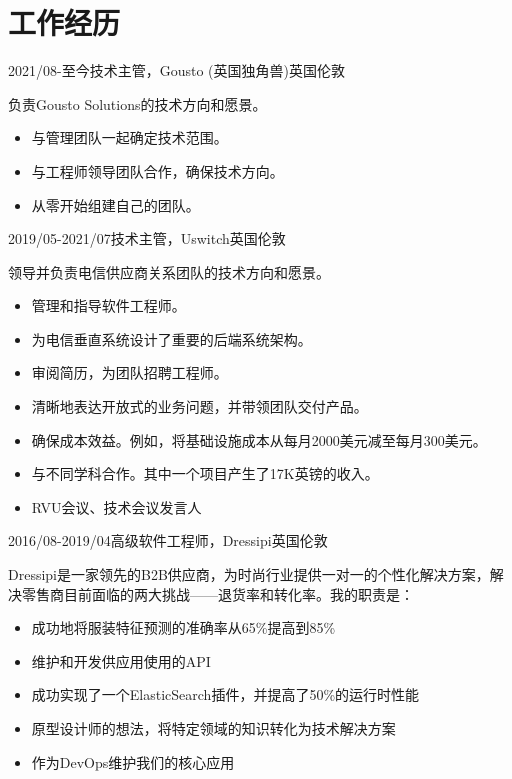 \documentclass[a4paper]{twentysecondcv-cn} %
\begin{document}
\section{工作经历}

\begin{twenty} %
	\twentyitem
	    {2021/08-至今}{技术主管，Gousto (英国独角兽)}{英国伦敦}
    	{负责Gousto Solutions的技术方向和愿景。
        	\begin{itemize}
              \item 与管理团队一起确定技术范围。
              \item 与工程师领导团队合作，确保技术方向。
              \item 从零开始组建自己的团队。
            \end{itemize}}
	\twentyitem
	    {2019/05-2021/07}{技术主管，Uswitch}{英国伦敦}
    	{领导并负责电信供应商关系团队的技术方向和愿景。
        	\begin{itemize}
              \item 管理和指导软件工程师。
              \item 为电信垂直系统设计了重要的后端系统架构。
              \item 审阅简历，为团队招聘工程师。
              \item 清晰地表达开放式的业务问题，并带领团队交付产品。
              \item 确保成本效益。例如，将基础设施成本从每月2000美元减至每月300美元。
              \item 与不同学科合作。其中一个项目产生了17K英镑的收入。
              \item RVU会议、技术会议发言人
            \end{itemize}}
	\twentyitem
	    {2016/08-2019/04}{高级软件工程师，Dressipi}{英国伦敦}
    	{Dressipi是一家领先的B2B供应商，为时尚行业提供一对一的个性化解决方案，解决零售商目前面临的两大挑战——退货率和转化率。我的职责是：
        	\begin{itemize}
              \item 成功地将服装特征预测的准确率从65\%提高到85\%
              \item 维护和开发供应用使用的API
              \item 成功实现了一个ElasticSearch插件，并提高了50\%的运行时性能
              \item 原型设计师的想法，将特定领域的知识转化为技术解决方案
              \item 作为DevOps维护我们的核心应用
            \end{itemize}}

\end{twenty}
\end{document}
